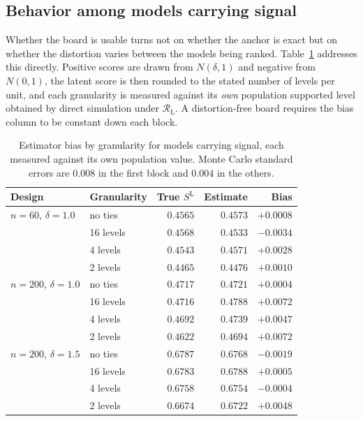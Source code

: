 \documentclass[11pt]{article}
\newcommand{\Regime}{\mathcal{R}}
\newcommand{\RegimeL}{\Regime_{\mathrm{L}}}
\newcommand{\SLead}{S^{\mathrm{L}}}
\theoremstyle{remark}
\begin{document}
\subsection{Behavior among models carrying signal}

Whether the board is usable turns not on whether the anchor is exact but on whether the distortion varies between the models being ranked. Table~\ref{tab:anchor-signal} addresses this directly. Positive scores are drawn from $N(\delta,1)$ and negative from $N(0,1)$, the latent score is then rounded to the stated number of levels per unit, and each granularity is measured against its \emph{own} population supported level obtained by direct simulation under $\RegimeL$. A distortion-free board requires the bias column to be constant down each block.

\begin{table}[ht]
\centering
\caption{Estimator bias by granularity for models carrying signal, each measured against its own population value. Monte Carlo standard errors are $0.008$ in the first block and $0.004$ in the others.}
\label{tab:anchor-signal}
\begin{tabular}{@{}llrrr@{}}
\toprule
Design & Granularity & True $\SLead$ & Estimate & Bias \\
\midrule
$n=60$, $\delta=1.0$ & no ties & $0.4565$ & $0.4573$ & $+0.0008$ \\
 & 16 levels & $0.4568$ & $0.4533$ & $-0.0034$ \\
 & 4 levels & $0.4543$ & $0.4571$ & $+0.0028$ \\
 & 2 levels & $0.4465$ & $0.4476$ & $+0.0010$ \\
\midrule
$n=200$, $\delta=1.0$ & no ties & $0.4717$ & $0.4721$ & $+0.0004$ \\
 & 16 levels & $0.4716$ & $0.4788$ & $+0.0072$ \\
 & 4 levels & $0.4692$ & $0.4739$ & $+0.0047$ \\
 & 2 levels & $0.4622$ & $0.4694$ & $+0.0072$ \\
\midrule
$n=200$, $\delta=1.5$ & no ties & $0.6787$ & $0.6768$ & $-0.0019$ \\
 & 16 levels & $0.6783$ & $0.6788$ & $+0.0005$ \\
 & 4 levels & $0.6758$ & $0.6754$ & $-0.0004$ \\
 & 2 levels & $0.6674$ & $0.6722$ & $+0.0048$ \\
\bottomrule
\end{tabular}
\end{table}
\end{document}

